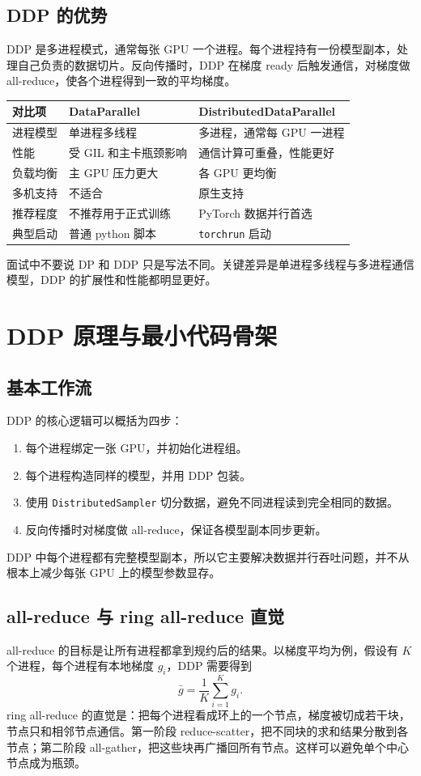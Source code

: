 \subsection{DDP 的优势}
DDP 是多进程模式，通常每张 GPU 一个进程。每个进程持有一份模型副本，处理自己负责的数据切片。反向传播时，DDP 在梯度 ready 后触发通信，对梯度做 all-reduce，使各个进程得到一致的平均梯度。
\begin{table}[htbp]
  \centering
  \begin{tabular}{lll}
    \toprule
    对比项 & DataParallel & DistributedDataParallel \\
    \midrule
    进程模型 & 单进程多线程 & 多进程，通常每 GPU 一进程 \\
    性能 & 受 GIL 和主卡瓶颈影响 & 通信计算可重叠，性能更好 \\
    负载均衡 & 主 GPU 压力更大 & 各 GPU 更均衡 \\
    多机支持 & 不适合 & 原生支持 \\
    推荐程度 & 不推荐用于正式训练 & PyTorch 数据并行首选 \\
    典型启动 & 普通 python 脚本 & \texttt{torchrun} 启动 \\
    \bottomrule
  \end{tabular}
\end{table}
\begin{trap}
面试中不要说 DP 和 DDP 只是写法不同。关键差异是单进程多线程与多进程通信模型，DDP 的扩展性和性能都明显更好。
\end{trap}
\section{DDP 原理与最小代码骨架}
\subsection{基本工作流}
DDP 的核心逻辑可以概括为四步：
\begin{enumerate}
  \item 每个进程绑定一张 GPU，并初始化进程组。
  \item 每个进程构造同样的模型，并用 DDP 包装。
  \item 使用 \texttt{DistributedSampler} 切分数据，避免不同进程读到完全相同的数据。
  \item 反向传播时对梯度做 all-reduce，保证各模型副本同步更新。
\end{enumerate}
DDP 中每个进程都有完整模型副本，所以它主要解决数据并行吞吐问题，并不从根本上减少每张 GPU 上的模型参数显存。
\subsection{all-reduce 与 ring all-reduce 直觉}
all-reduce 的目标是让所有进程都拿到规约后的结果。以梯度平均为例，假设有 $K$ 个进程，每个进程有本地梯度 $g_i$，DDP 需要得到
\[
  \bar{g} = \frac{1}{K}\sum_{i=1}^{K} g_i .
\]
ring all-reduce 的直觉是：把每个进程看成环上的一个节点，梯度被切成若干块，节点只和相邻节点通信。第一阶段 reduce-scatter，把不同块的求和结果分散到各节点；第二阶段 all-gather，把这些块再广播回所有节点。这样可以避免单个中心节点成为瓶颈。
